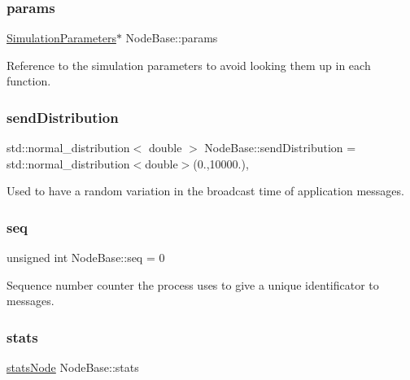 \subsubsection{\texorpdfstring{params}{params}}
{\footnotesize\ttfamily \hyperlink{class_simulation_parameters}{Simulation\+Parameters}$\ast$ Node\+Base\+::params\hspace{0.3cm}{\ttfamily [protected]}}



Reference to the simulation parameters to avoid looking them up in each function. 

\mbox{\label{class_node_base_ab8e4cc30083c58d14b22d928a78cb8ac}} 
\subsubsection{\texorpdfstring{send\+Distribution}{sendDistribution}}
{\footnotesize\ttfamily std\+::normal\+\_\+distribution$<$ double $>$ Node\+Base\+::send\+Distribution = std\+::normal\+\_\+distribution$<$double$>$(0.,10000.)\hspace{0.3cm}{\ttfamily [static]}, {\ttfamily [protected]}}



Used to have a random variation in the broadcast time of application messages. 

\mbox{\label{class_node_base_a4fe5b1b7aeb49d15ec7986133346aeb7}} 
\subsubsection{\texorpdfstring{seq}{seq}}
{\footnotesize\ttfamily unsigned int Node\+Base\+::seq = 0\hspace{0.3cm}{\ttfamily [protected]}}



Sequence number counter the process uses to give a unique identificator to messages. 

\mbox{\label{class_node_base_a12b20bca634637499bf55020c398424e}} 
\subsubsection{\texorpdfstring{stats}{stats}}
{\footnotesize\ttfamily \hyperlink{_node_base_8h_a6d83bdf09c8e309d31f9330091b0d10d}{stats\+Node} Node\+Base\+::stats\hspace{0.3cm}{\ttfamily [protected]}}




